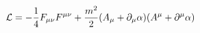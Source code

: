 \begin{equation}
{\cal{L}} = -\frac{1}{4}F_{\mu \nu }F^{\mu \nu } + \frac{m^2}{2} (A_\mu + \partial_\mu \alpha)
(A^\mu + \partial^\mu \alpha)
\label{554}
\end{equation}

